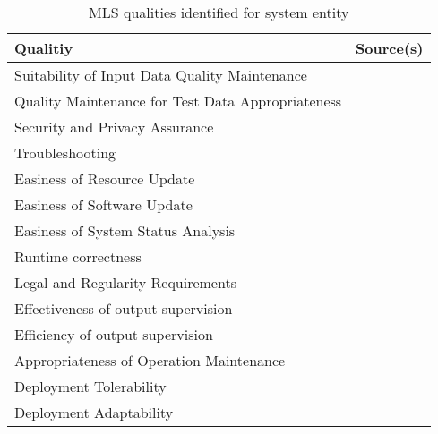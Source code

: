\begin{table}[h]\label{tb:LiteratureQualitiesSystem}
    \centering\footnotesize
    \begin{tabular}{p{} p{}}
        \textbf{Qualitiy} & \textbf{Source(s)} \\
        \toprule
        Suitability of Input Data Quality Maintenance &~\cite{nakamichi_requirements-driven_2020} \\
        Quality Maintenance for Test Data Appropriateness&~\cite{nakamichi_requirements-driven_2020}\\
        Security and Privacy Assurance&~\cite{nakamichi_requirements-driven_2020,zhang_machine_2020}\\
        Troubleshooting &~\cite{arpteg_software_2018} \\
        Easiness of Resource Update &~\cite{nakamichi_requirements-driven_2020} \\
        Easiness of Software Update &~\cite{nakamichi_requirements-driven_2020} \\
        Easiness of System Status Analysis &~\cite{nakamichi_requirements-driven_2020} \\
        Runtime correctness &~\cite{siebert_construction_2021} \\
        Legal and Regularity Requirements &~\cite{vogelsang_requirements_2019} \\
        Effectiveness of output supervision &~\cite{siebert_construction_2021} \\
        Efficiency of output supervision &~\cite{siebert_construction_2021} \\
        Appropriateness of Operation Maintenance &~\cite{nakamichi_requirements-driven_2020} \\
        Deployment Tolerability &~\cite{ashmore_assuring_2021} \\
        Deployment Adaptability &~\cite{ashmore_assuring_2021} \\
    \end{tabular}
    \caption{MLS qualities identified for system entity}
\end{table}
